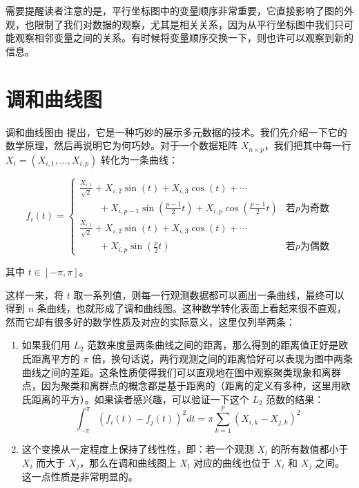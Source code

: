 \documentclass[
  b5paper,
  UTF8,twoside]{book}
\begin{document}
需要提醒读者注意的是，平行坐标图中的变量顺序非常重要，它直接影响了图的外观，也限制了我们对数据的观察，尤其是相关关系，因为从平行坐标图中我们只可能观察相邻变量之间的关系。有时候将变量顺序交换一下，则也许可以观察到新的信息。

\section{调和曲线图}\label{sec:andrews-curve}

调和曲线图由 \citet{Andrews72} 提出，它是一种巧妙的展示多元数据的技术。我们先介绍一下它的数学原理，然后再说明它为何巧妙。对于一个数据矩阵 \(X_{n\times p}\)，我们把其中每一行 \(X_{i}=\left(X_{i,1},\ldots,X_{i,p}\right)\) 转化为一条曲线：

\begin{equation}
f_{i}(t)=\begin{cases}
\frac{X_{i,1}}{\sqrt{2}}+X_{i,2}\sin(t)+X_{i,3}\cos(t)+\cdots\\
\qquad+X_{i,p-1}\sin(\frac{p-1}{2}t)+X_{i,p}\cos(\frac{p-1}{2}t) & \text{若}p\text{为奇数}\\
\frac{X_{i,1}}{\sqrt{2}}+X_{i,2}\sin(t)+X_{i,3}\cos(t)+\cdots\\
\qquad+X_{i,p}\sin(\frac{p}{2}t) & \text{若}p\text{为偶数}
\end{cases} 
\label{eq:andrews-curve}
\end{equation}

其中 \(t\in[-\pi,\pi]\)。

这样一来，将 \(t\) 取一系列值，则每一行观测数据都可以画出一条曲线，最终可以得到 \(n\) 条曲线，也就形成了调和曲线图。这种数学转化表面上看起来很不直观，然而它却有很多好的数学性质及对应的实际意义，这里仅列举两条：

\begin{enumerate}
\def\labelenumi{\arabic{enumi}.}
\item
  如果我们用 \(L_{2}\) 范数来度量两条曲线之间的距离，那么得到的距离值正好是欧氏距离平方的 \(\pi\) 倍，换句话说，两行观测之间的距离恰好可以表现为图中两条曲线之间的差距。这条性质使得我们可以直观地在图中观察聚类现象和离群点，因为聚类和离群点的概念都是基于距离的（距离的定义有多种，这里用欧氏距离的平方）。如果读者感兴趣，可以验证一下这个 \(L_{2}\) 范数的结果：
  \[\int_{-\pi}^{\pi}\left(f_{i}(t)-f_{j}(t)\right)^{2}dt=\pi\sum_{k=1}^{p}\left(X_{i,k}-X_{j,k}\right)^{2}\]
\item
  这个变换从一定程度上保持了线性性，即：若一个观测 \(X_{l}\) 的所有数值都小于 \(X_{i}\) 而大于 \(X_{j}\)，那么在调和曲线图上 \(X_{l}\) 对应的曲线也位于 \(X_{i}\) 和 \(X_{j}\) 之间。这一点性质是非常明显的。
\end{enumerate}
\end{document}
